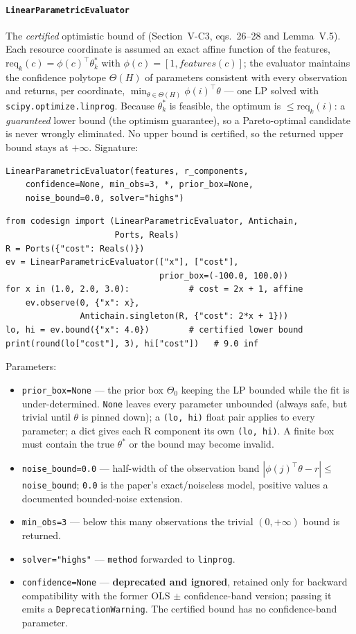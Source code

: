 \documentclass[11pt,a4paper]{article}
\begin{document}
\paragraph{\texttt{LinearParametricEvaluator}}%
\label{ref:online:linearparametricevaluator}
The \emph{certified} optimistic bound of \citet{alharbi2026online} (Section~V-C3,
eqs.\ 26--28 and Lemma~V.5). Each resource coordinate is assumed an exact
affine function of the features, $\text{req}_k(c)=\phi(c)^\top\theta_k^*$
with $\phi(c)=[1,features(c)]$; the evaluator maintains the confidence
polytope $\Theta(H)$ of parameters consistent with every observation and
returns, per coordinate, $\min_{\theta\in\Theta(H)}\phi(i)^\top\theta$ --- one
LP solved with \texttt{scipy.optimize.linprog}. Because $\theta_k^*$ is
feasible, the optimum is $\leq \text{req}_k(i)$: a \emph{guaranteed} lower
bound (the optimism guarantee), so a Pareto-optimal candidate is never
wrongly eliminated. No upper bound is certified, so the returned upper bound
stays at $+\infty$. Signature:
\begin{lstlisting}
LinearParametricEvaluator(features, r_components,
    confidence=None, min_obs=3, *, prior_box=None,
    noise_bound=0.0, solver="highs")
\end{lstlisting}
\begin{lstlisting}
from codesign import (LinearParametricEvaluator, Antichain,
                      Ports, Reals)
R = Ports({"cost": Reals()})
ev = LinearParametricEvaluator(["x"], ["cost"],
                               prior_box=(-100.0, 100.0))
for x in (1.0, 2.0, 3.0):            # cost = 2x + 1, affine
    ev.observe(0, {"x": x},
               Antichain.singleton(R, {"cost": 2*x + 1}))
lo, hi = ev.bound({"x": 4.0})        # certified lower bound
print(round(lo["cost"], 3), hi["cost"])   # 9.0 inf
\end{lstlisting}
Parameters:
\begin{itemize}[nosep]
  \item \texttt{prior\_box=None} --- the prior box $\Theta_0$ keeping the LP
    bounded while the fit is under-determined. \texttt{None} leaves every
    parameter unbounded (always safe, but trivial until $\theta$ is pinned
    down); a \texttt{(lo, hi)} float pair applies to every parameter; a
    dict gives each R component its own \texttt{(lo, hi)}. A finite box must
    contain the true $\theta^*$ or the bound may become invalid.
  \item \texttt{noise\_bound=0.0} --- half-width of the observation band
    $|\phi(j)^\top\theta - r| \leq$ \texttt{noise\_bound}; \texttt{0.0} is
    the paper's exact/noiseless model, positive values a documented
    bounded-noise extension.
  \item \texttt{min\_obs=3} --- below this many observations the trivial
    $(0,+\infty)$ bound is returned.
  \item \texttt{solver="highs"} --- \texttt{method} forwarded to
    \texttt{linprog}.
  \item \texttt{confidence=None} --- \textbf{deprecated and ignored},
    retained only for backward compatibility with the former OLS
    $\pm$ confidence-band version; passing it emits a
    \texttt{DeprecationWarning}. The certified bound has no confidence-band
    parameter.
\end{itemize}
\end{document}
